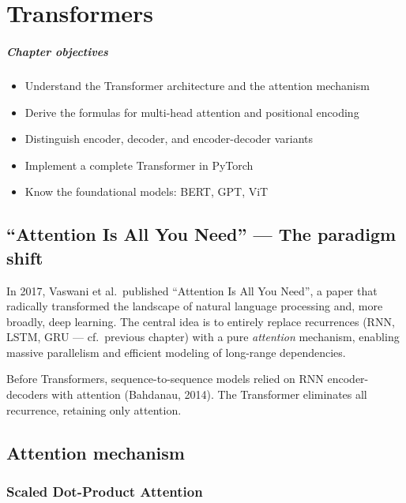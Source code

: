 \chapter{Transformers}
\label{ch:transformers}

\paragraph{Chapter objectives}
\begin{itemize}
\item Understand the Transformer architecture and the attention mechanism
\item Derive the formulas for multi-head attention and positional encoding
\item Distinguish encoder, decoder, and encoder-decoder variants
\item Implement a complete Transformer in PyTorch
\item Know the foundational models: BERT, GPT, ViT
\end{itemize}

\section{``Attention Is All You Need'' --- The paradigm shift}
\label{sec:transformers-intro}

In 2017, Vaswani et al.\ published ``Attention Is All You Need'', a paper that radically transformed the landscape of natural language processing and, more broadly, deep learning. The central idea is to entirely replace recurrences (RNN, LSTM, GRU --- cf.\ previous chapter) with a pure \emph{attention} mechanism, enabling massive parallelism and efficient modeling of long-range dependencies.

\begin{remark}
Before Transformers, sequence-to-sequence models relied on RNN encoder-decoders with attention (Bahdanau, 2014). The Transformer eliminates all recurrence, retaining only attention.
\end{remark}

\section{Attention mechanism}
\label{sec:attention-mechanism}

\subsection{Scaled Dot-Product Attention}

